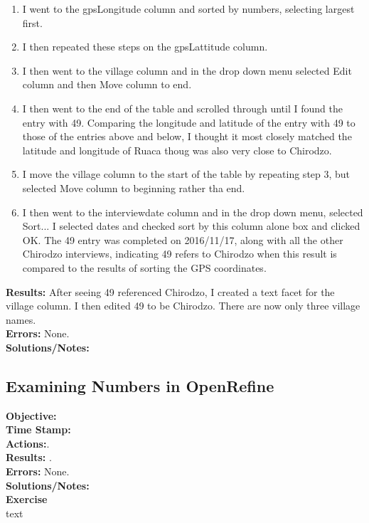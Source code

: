 \documentclass{article}
\begin{document}
\begin{FlushLeft}
\begin{enumerate}
    \item I went to the gps\textunderscore Longitude column and sorted by numbers, selecting largest first.
    \item I then repeated these steps on the gps\textunderscore Lattitude column.
    \item I then went to the village column and in the drop down menu selected Edit column and then Move column to end.
    \item I then went to the end of the table and scrolled through until I found the entry with 49. Comparing the longitude and latitude of the entry with 49 to those of the entries above and below, I thought it most closely matched the latitude and longitude of Ruaca thoug was also very close to Chirodzo.
    \item I move the village column to the start of the table by repeating step 3, but selected Move column to beginning rather tha end.
    \item I then went to the interview\textunderscore date column and in the drop down menu, selected Sort... I selected dates and checked sort by this column alone box and clicked OK. The 49 entry was completed on 2016/11/17, along with all the other Chirodzo interviews, indicating 49 refers to Chirodzo when this result is compared to the results of sorting the GPS coordinates.
\end{enumerate}
\textbf{Results:} After seeing 49 referenced Chirodzo, I created a text facet for the village column. I then edited 49 to be Chirodzo. There are now only three village names.\\
\textbf{Errors:} None.\\
\textbf{Solutions/Notes:}\\

\subsection{Examining Numbers in OpenRefine}\label{sec:numbers}
\textbf{Objective: }\\ 
\textbf{Time Stamp:} \\
\textbf{Actions:}.\\
\textbf{Results:} . \\
\textbf{Errors:} None.\\
\textbf{Solutions/Notes:}\\
\vspace{5mm}
\textbf{Exercise}\\ 
text\\
\vspace{5mm}


\end{FlushLeft}
\end{document}
